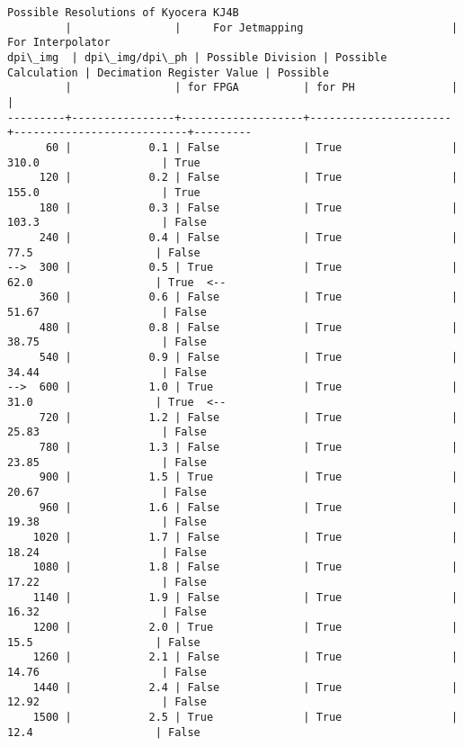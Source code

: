 \documentclass{article}
\begin{document}
    \begin{Verbatim}[commandchars=\\\{\}]
Possible Resolutions of Kyocera KJ4B
         |                |     For Jetmapping                       |      For Interpolator               
dpi\_img  | dpi\_img/dpi\_ph | Possible Division | Possible Calculation | Decimation Register Value | Possible
         |                | for FPGA          | for PH               |                           |         
---------+----------------+-------------------+----------------------+---------------------------+---------
      60 |            0.1 | False             | True                 |   310.0                   | True
     120 |            0.2 | False             | True                 |   155.0                   | True
     180 |            0.3 | False             | True                 |   103.3                   | False
     240 |            0.4 | False             | True                 |    77.5                   | False
-->  300 |            0.5 | True              | True                 |    62.0                   | True  <--
     360 |            0.6 | False             | True                 |   51.67                   | False
     480 |            0.8 | False             | True                 |   38.75                   | False
     540 |            0.9 | False             | True                 |   34.44                   | False
-->  600 |            1.0 | True              | True                 |    31.0                   | True  <--
     720 |            1.2 | False             | True                 |   25.83                   | False
     780 |            1.3 | False             | True                 |   23.85                   | False
     900 |            1.5 | True              | True                 |   20.67                   | False
     960 |            1.6 | False             | True                 |   19.38                   | False
    1020 |            1.7 | False             | True                 |   18.24                   | False
    1080 |            1.8 | False             | True                 |   17.22                   | False
    1140 |            1.9 | False             | True                 |   16.32                   | False
    1200 |            2.0 | True              | True                 |    15.5                   | False
    1260 |            2.1 | False             | True                 |   14.76                   | False
    1440 |            2.4 | False             | True                 |   12.92                   | False
    1500 |            2.5 | True              | True                 |    12.4                   | False

\end{Verbatim}
\end{document}
